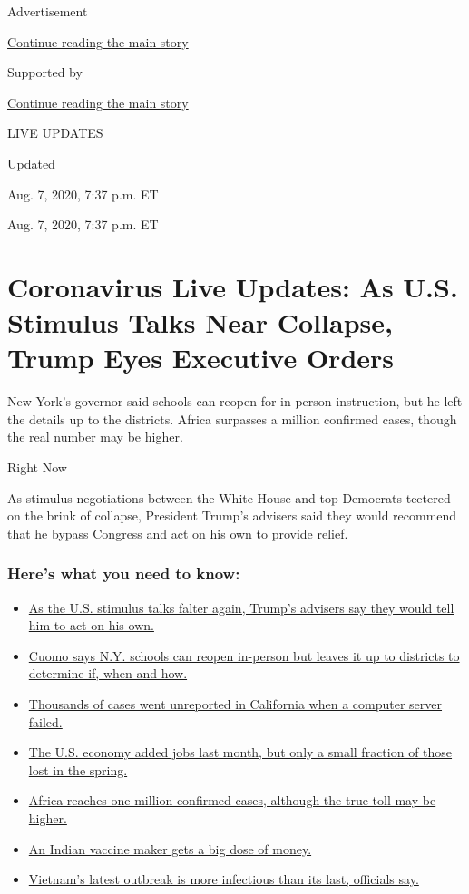 Advertisement

\protect\hyperlink{after-top}{Continue reading the main story}

Supported by

\protect\hyperlink{after-sponsor}{Continue reading the main story}

LIVE UPDATES

Updated~

Aug. 7, 2020, 7:37 p.m. ET

Aug. 7, 2020, 7:37 p.m. ET

\hypertarget{coronavirus-live-updates-as-us-stimulus-talks-near-collapse-trump-eyes-executive-orders}{%
\section{Coronavirus Live Updates: As U.S. Stimulus Talks Near Collapse,
Trump Eyes Executive
Orders}\label{coronavirus-live-updates-as-us-stimulus-talks-near-collapse-trump-eyes-executive-orders}}

New York's governor said schools can reopen for in-person instruction,
but he left the details up to the districts. Africa surpasses a million
confirmed cases, though the real number may be higher.

Right Now

As stimulus negotiations between the White House and top Democrats
teetered on the brink of collapse, President Trump's advisers said they
would recommend that he bypass Congress and act on his own to provide
relief.

\hypertarget{heres-what-you-need-to-know}{%
\subsubsection{Here's what you need to
know:}\label{heres-what-you-need-to-know}}

\begin{itemize}
\tightlist
\item
  \protect\hyperlink{link-232a7bee}{As the U.S. stimulus talks falter
  again, Trump's advisers say they would tell him to act on his own.}
\item
  \protect\hyperlink{link-3f64a70a}{Cuomo says N.Y. schools can reopen
  in-person but leaves it up to districts to determine if, when and
  how.}
\item
  \protect\hyperlink{link-14e70066}{Thousands of cases went unreported
  in California when a computer server failed.}
\item
  \protect\hyperlink{link-25231883}{The U.S. economy added jobs last
  month, but only a small fraction of those lost in the spring.}
\item
  \protect\hyperlink{link-16eac8b3}{Africa reaches one million confirmed
  cases, although the true toll may be higher.}
\item
  \protect\hyperlink{link-6a490ffc}{An Indian vaccine maker gets a big
  dose of money.}
\item
  \protect\hyperlink{link-3edb9761}{Vietnam's latest outbreak is more
  infectious than its last, officials say.}
\end{itemize}

